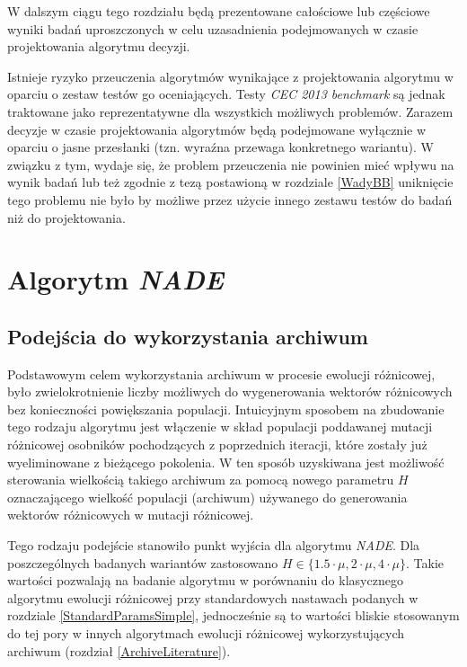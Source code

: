 \documentclass[12pt,a4paper]{report}
\begin{document}
{{{{{{\par{
W dalszym ciągu tego rozdziału będą prezentowane całościowe lub częściowe wyniki badań uproszczonych w celu uzasadnienia podejmowanych w czasie projektowania algorytmu decyzji.
\par{
Istnieje ryzyko przeuczenia algorytmów wynikające z projektowania algorytmu w oparciu o zestaw testów go oceniających. Testy \emph{CEC 2013 benchmark} są jednak traktowane jako reprezentatywne dla wszystkich możliwych problemów. Zarazem decyzje w czasie projektowania algorytmów będą podejmowane wyłącznie w oparciu o jasne przesłanki (tzn. wyraźna przewaga konkretnego wariantu). W związku z tym, wydaje się, że problem przeuczenia nie powinien mieć wpływu na wynik badań lub też zgodnie z tezą postawioną w rozdziale \ref{WadyBB} uniknięcie tego problemu nie było by możliwe przez użycie innego zestawu testów do badań niż do projektowania.
}

\section{Algorytm \emph{NADE}}
\subsection{Podejścia do wykorzystania archiwum}
\par{
Podstawowym celem wykorzystania archiwum w procesie ewolucji różnicowej, było zwielokrotnienie liczby możliwych do wygenerowania wektorów różnicowych bez konieczności powiększania populacji. Intuicyjnym sposobem na zbudowanie tego rodzaju algorytmu jest włączenie w skład populacji poddawanej mutacji różnicowej osobników pochodzących z poprzednich iteracji, które zostały już wyeliminowane z bieżącego pokolenia. W ten sposób uzyskiwana jest możliwość sterowania wielkością takiego archiwum za pomocą nowego parametru $H$ oznaczającego wielkość populacji (archiwum) używanego do generowania wektorów różnicowych w mutacji różnicowej.
}
\par{
Tego rodzaju podejście stanowiło punkt wyjścia dla algorytmu \emph{NADE}. Dla poszczególnych badanych wariantów zastosowano $H \in \{ 1.5 \cdot \mu, 2 \cdot \mu, 4 \cdot \mu \}$.  Takie wartości pozwalają na badanie algorytmu w porównaniu do klasycznego algorytmu ewolucji różnicowej przy standardowych nastawach podanych w rozdziale \ref{StandardParamsSimple}, jednocześnie są to wartości bliskie stosowanym do tej pory w innych algorytmach ewolucji różnicowej wykorzystujących archiwum (rozdział \ref{ArchiveLiterature}).
}
}}}}}}}
\end{document}
